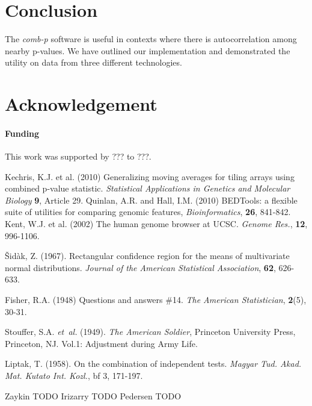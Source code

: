 \documentclass{bioinfo}
\begin{document}
\section{Conclusion}
The \textit{comb-p} software is useful in contexts where there is
autocorrelation among nearby p-values. We have outlined our implementation
and demonstrated the utility on data from three different technologies.

\section*{Acknowledgement}

\paragraph{Funding\textcolon} This work was supported by ??? to ???.

%
%
%
%
%

%

%
\begin{thebibliography}{}
 Kechris, K.J. et al. (2010)
Generalizing moving averages for tiling arrays using combined p-value
statistic. {\it Statistical Applications in Genetics and Molecular Biology}
{\bf 9}, Article 29.
 Quinlan, A.R. and Hall, I.M. (2010) BEDTools: a flexible suite of utilities for comparing genomic features, {\it Bioinformatics}, {\bf 26}, 841-842.
 Kent, W.J. et al. (2002) The human genome browser at UCSC. {\it Genome Res.}, {\bf 12}, 996-1106.

Šidàk, Z. (1967).
Rectangular conﬁdence region for the means of multivariate normal distributions.
\textit{Journal of the American Statistical Association}, {\bf 62}, 626-633.

Fisher, R.A. (1948)
Questions and answers \#14.
{\it The American Statistician}, {\bf 2}(5), 30-31.

Stouffer, S.A. \textit{et~al.} (1949). \textit{The American Soldier},
Princeton University Press, Princeton, NJ. Vol.1: Adjustment during Army Life.

Liptak, T. (1958). On the combination of independent tests. {\it Magyar Tud. Akad. Mat. Kutato Int. Kozl.}, {bf 3}, 171-197.

 Zaykin TODO
 Irizarry TODO
 Pedersen TODO

\end{thebibliography}
\end{document}
